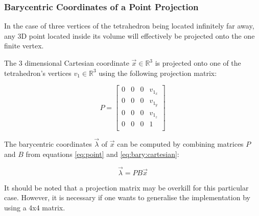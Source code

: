 \subsubsection{Barycentric Coordinates of a Point Projection}

In the case of three vertices of  the  tetrahedron  being located infinitely far
away, any 3D point located  inside its volume will effectively be projected onto
the one finite vertex.

The  3  dimensional Cartesian coordinate $\vec{x}\in\mathbb{R}^3$  is  projected
onto  one  of  the  tetrahedron's  vertices  $v_1 \in  \mathbb{R}^3$  using  the
following projection matrix:

\begin{equation}
    \label{eq:point}
    P = \begin{bmatrix}
        0 & 0 & 0 & v_{1_x} \\
        0 & 0 & 0 & v_{1_y} \\
        0 & 0 & 0 & v_{1_z} \\
        0 & 0 & 0 & 1 \\
    \end{bmatrix}
\end{equation}

The barycentric coordinates $\vec{\lambda}$  of  $\vec{x}$  can  be  computed by
combining   matrices   $P$   and   $B$   from   equations   \ref{eq:point}   and
\ref{eq:bary:cartesian}:

\begin{equation}
    \vec{\lambda} = PB\vec{x}
\end{equation}

It should be noted that a projection  matrix may be overkill for this particular
case. However, it is necessary if one wants to generalise  the implementation by
using a 4x4 matrix.

